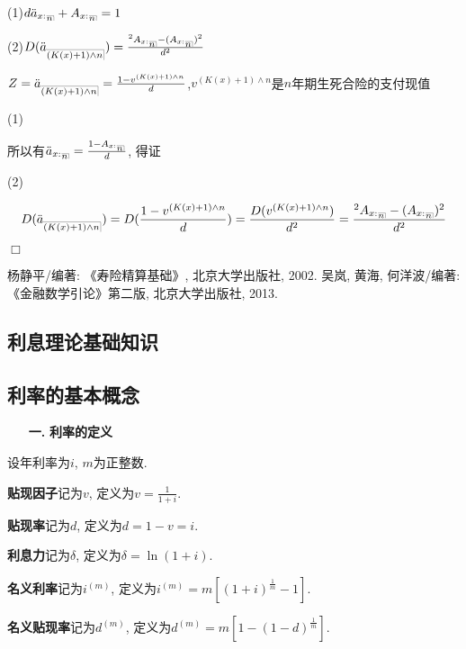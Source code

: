 \documentclass[a4paper,10pt]{ctexbook}
\makeatletter
\newcommand{\hei}{\CJKfamily{hei}}      %
\def\qed{\hfill$\Box$\medskip}
\DeclareRobustCommand{\annu}[1]{_{%
    \def\arraystretch{0}%
    \setlength\arraycolsep{1pt}%
    \setlength\arrayrulewidth{.2pt}%
    \begin{array}[b]{@{}c|}\hline
        \\[\arraycolsep]%
        \scriptstyle #1%
    \end{array}%
}}
\makeatother
\begin{document}
(1)$d\ddot a_{x:}{}_{\annu n}+A_{x:}{}_{\annu n}=1$

(2)$D(\ddot a_{\annu {(K(x)+1)\land n}})=\frac{{}^2A_{x:}{}_{\annu n}-(A_{x:}{}_{\annu n})^2}{d^2}$

\proof
$Z=\ddot a_{\annu {(K(x)+1)\land n}}=\frac{1-v^{(K(x)+1)\land n}}{d}$,$v^{(K(x)+1)\land n}$是$n$年期生死合险的支付现值

(1)

所以有$\ddot a_{x:}{}_{\annu n}=\frac{1-A_{x:}{}_{\annu n}}{d}$, 得证

(2)

\begin{align*}
    D(\ddot a_{\annu {(K(x)+1)\land n}})=D(\frac{1-v^{(K(x)+1)\land n}}{d})=\frac{D(v^{(K(x)+1)\land n})}{d^2}=\frac{{}^2A_{x:}{}_{\annu n}-(A_{x:}{}_{\annu n})^2}{d^2}
\end{align*}

\qed


\begin{thebibliography}{99}
    杨静平/编著: 《寿险精算基础》, 北京大学出版社, 2002.
     吴岚, 黄海, 何洋波/编著: 《金融数学引论》第二版, 北京大学出版社, 2013.

\end{thebibliography}

\begin{appendix}
    \chapter{利息理论基础知识}
    \section{利率的基本概念}
    \begin{itemize}
        \item[{\bf\hei 一.}]{\bf\hei 利率的定义}
    \end{itemize}

    设年利率为$i$, $m$为正整数.

    \textbf{贴现因子}记为$v$, 定义为$v=\frac{1}{1+i}$.

    \textbf{贴现率}记为$d$, 定义为$d=1-v=i$.

    \textbf{利息力}记为$\delta$, 定义为$\delta=\ln(1+i)$.

    \textbf{名义利率}记为$i^{(m)}$, 定义为$i^{(m)}=m[(1+i)^{\frac{1}{m}}-1]$.

    \textbf{名义贴现率}记为$d^{(m)}$, 定义为$d^{(m)}=m[1-(1-d)^{\frac{1}{m}}]$.
\end{appendix}
\end{document}
